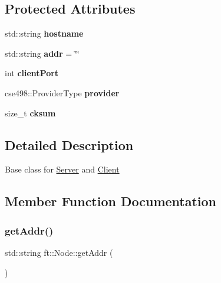 \subsection*{Protected Attributes}
\begin{DoxyCompactItemize}
\item 
\mbox{\label{classft_1_1Node_a46124887e675ddcd5bfdba6c4a015964}} 
std\+::string {\bfseries hostname}
\item 
\mbox{\label{classft_1_1Node_ac321a30ddc190fe5a3ec93869adaf82d}} 
std\+::string {\bfseries addr} = \char`\"{}\char`\"{}
\item 
\mbox{\label{classft_1_1Node_a520e4c96f13e8ce7cea0c8bf21b83c5f}} 
int {\bfseries client\+Port}
\item 
\mbox{\label{classft_1_1Node_a3f16f19902a912ce42a81439b6f4500e}} 
cse498\+::\+Provider\+Type {\bfseries provider}
\item 
\mbox{\label{classft_1_1Node_ab4561d8c56968bfe211550eeea205761}} 
size\+\_\+t {\bfseries cksum}
\end{DoxyCompactItemize}


\subsection{Detailed Description}
Base class for \mbox{\hyperlink{classft_1_1Server}{Server}} and \mbox{\hyperlink{classft_1_1Client}{Client}} 

\subsection{Member Function Documentation}
\mbox{\label{classft_1_1Node_aabbf4a7cd8fcea779622b65a4bf75e94}} 
\subsubsection{\texorpdfstring{get\+Addr()}{getAddr()}}
{\footnotesize\ttfamily std\+::string ft\+::\+Node\+::get\+Addr (\begin{DoxyParamCaption}{ }\end{DoxyParamCaption})\hspace{0.3cm}{\ttfamily [inline]}}

